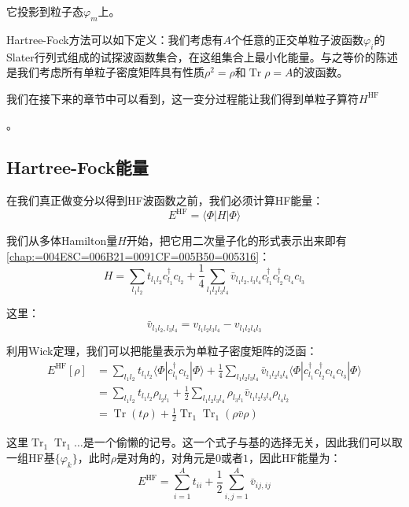 它投影到粒子态$\varphi_{m}$上。

Hartree-Fock方法可以如下定义：我们考虑有$A$个任意的正交单粒子波函数$\varphi_{i}$的Slater行列式组成的试探波函数集合，在这组集合上最小化能量。与之等价的陈述是我们考虑所有单粒子密度矩阵具有性质$\rho^{2}=\rho$和$\mathop{\text{Tr}}\rho=A$的波函数。

我们在接下来的章节中可以看到，这一变分过程能让我们得到单粒子算符$H^{\text{HF}}$

。

\subsection{Hartree-Fock能量}

在我们真正做变分以得到HF波函数之前，我们必须计算HF能量：
\[
E^{\text{HF}}=\langle\Phi|H|\Phi\rangle
\]

我们从多体Hamilton量$H$开始，把它用二次量子化的形式表示出来即有\ref{chap:=004E8C=006B21=0091CF=005B50=005316}：
\[
H=\sum_{l_{1}l_{2}}t_{l_{1}l_{2}}c^{\dagger}_{l_{1}}c_{l_{2}}+\frac{1}{4}\sum_{l_{1}l_{2}l_{3}l_{4}}\bar{v}_{l_{1}l_{2},l_{3}l_{4}}c^{\dagger}_{l_{1}}c^{\dagger}_{l_{2}}c_{l_{4}}c_{l_{3}}
\]

这里：
\[
\bar{v}_{l_{1}l_{2},l_{3}l_{4}}=v_{l_{1}l_{2}l_{3}l_{4}}-v_{l_{1}l_{2}l_{4}l_{3}}
\]

利用Wick定理，我们可以把能量表示为单粒子密度矩阵的泛函：
\begin{align}
E^{\text{HF}}[\rho] & =\sum_{l_{1}l_{2}}t_{l_{1}l_{2}}\langle\Phi|c^{\dagger}_{l_{1}}c_{l_{2}}|\Phi\rangle+\frac{1}{4}\sum_{l_{1}l_{2}l_{3}l_{4}}\bar{v}_{l_{1}l_{2}l_{3}l_{4}}\langle\Phi|c^{\dagger}_{l_{1}}c^{\dagger}_{l_{2}}c_{l_{4}}c_{l_{3}}|\Phi\rangle\nonumber \\
 & =\sum_{l_{1}l_{2}}t_{l_{1}l_{2}}\rho_{l_{2}l_{1}}+\frac{1}{2}\sum_{l_{1}l_{2}l_{3}l_{4}}\rho_{l_{3}l_{1}}\bar{v}_{l_{1}l_{2}l_{3}l_{4}}\rho_{l_{4}l_{2}}\label{eq:HF energy}\\
 & =\mathop{\text{Tr}}(t\rho)+\frac{1}{2}\mathop{\text{Tr}}_{1}\mathop{\text{Tr}}_{1}(\rho\bar{v}\rho)\nonumber 
\end{align}

这里$\mathop{\text{Tr}}_{1}\mathop{\text{Tr}}_{1}\dots$是一个偷懒的记号。这一个式子与基的选择无关，因此我们可以取一组HF基$\{\varphi_{k}\}$，此时$\rho$是对角的，对角元是$0$或者$1$，因此HF能量为：
\begin{equation}
E^{\text{HF}}=\sum^{A}_{i=1}t_{ii}+\frac{1}{2}\sum^{A}_{i,j=1}\bar{v}_{ij,ij}\label{eq:HF energy in HF basis}
\end{equation}


